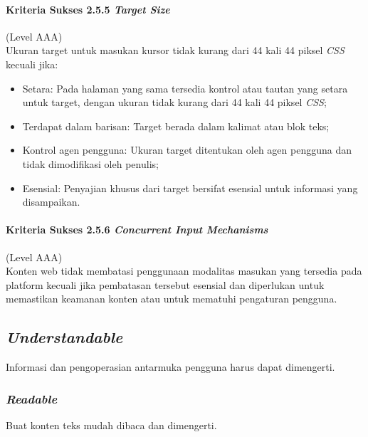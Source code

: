 \paragraph{Kriteria Sukses 2.5.5 \textit{Target Size}}
\label{sec:kriteria_sukses_2.5.5}
(Level AAA)\\

Ukuran target untuk masukan kursor tidak kurang dari 44 kali 44 piksel \textit{CSS} kecuali jika:

\begin{itemize}
	\item Setara: Pada halaman yang sama tersedia kontrol atau tautan yang setara untuk target, dengan ukuran tidak kurang dari 44 kali 44 piksel \textit{CSS};  
	\item Terdapat dalam barisan: Target berada dalam kalimat atau blok teks;
	\item Kontrol agen pengguna: Ukuran target ditentukan oleh agen pengguna dan tidak dimodifikasi oleh penulis;
	\item Esensial: Penyajian khusus dari target bersifat esensial untuk informasi yang disampaikan.
\end{itemize}

\paragraph{Kriteria Sukses 2.5.6 \textit{Concurrent Input Mechanisms}}
\label{sec:kriteria_sukses_2.5.6}
(Level AAA)\\

Konten web tidak membatasi penggunaan modalitas masukan yang tersedia pada platform kecuali jika pembatasan tersebut esensial dan diperlukan untuk memastikan keamanan konten atau untuk mematuhi pengaturan pengguna.


\subsection{\textit{Understandable}}
\label{sec:understandable}
Informasi dan pengoperasian antarmuka pengguna harus dapat dimengerti.

\subsubsection{\textit{Readable}}
\label{sec:readable}
Buat konten teks mudah dibaca dan dimengerti.

